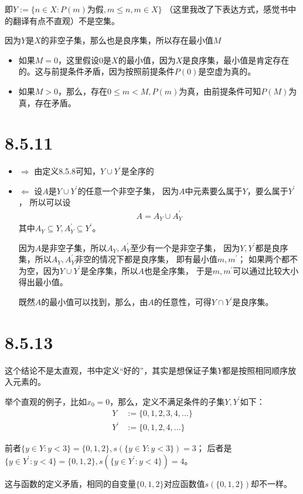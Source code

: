 \documentclass{article}
\begin{document}
即$Y := \{n \in X: P(m) \text{为假},  m \leq n, m \in X  \}$
（这里我改了下表达方式，感觉书中的翻译有点不直观）不是空集。

因为$Y$是$X$的非空子集，那么也是良序集，所以存在最小值$M$

\begin{itemize}
  \item 如果$M = 0$，这里假设$0$是$X$的最小值，因为$X$是良序集，最小值是肯定存在的。这与前提条件矛盾，因为按照前提条件$P(0)$是空虚为真的。
  \item 如果$M > 0$，那么，存在$0 \leq m < M, P(m)$为真，由前提条件可知$P(M)$为真，存在矛盾。
\end{itemize}

\section*{8.5.11}
\begin{itemize}
  \item $\Rightarrow$ 由定义8.5.8可知，$Y \cup Y^\prime$是全序的
  \item $\Leftarrow$ 
        设$A$是$Y \cup Y^\prime$的任意一个非空子集，
        因为$A$中元素要么属于$Y$，要么属于$Y^\prime$，
        所以可以设
        \begin{align*}
          A = A_Y \cup A_Y^\prime
        \end{align*}
        其中$A_Y \subseteq Y, A_Y^\prime \subseteq Y^\prime$。

        因为$A$是非空子集，所以$A_Y, A_Y^\prime$至少有一个是非空子集，
        因为$Y, Y^\prime$都是良序集，所以$A_Y, A_Y^\prime$非空的情况下都是良序集，
        即有最小值$m, m^\prime$；
        如果两个都不为空，因为$Y \cup Y^\prime$是全序集，所以$A$也是全序集，
        于是$m, m^\prime$可以通过比较大小
        得出最小值。
        
        既然$A$的最小值可以找到，那么，由$A$的任意性，可得$Y \cap Y^\prime $是良序集。


\end{itemize}

\section*{8.5.13}

\begin{zremark}
  这个结论不是太直观，书中定义“好的”，其实是想保证子集$Y$都是按照相同顺序放入元素的。

  举个直观的例子，比如$x_0 = 0$，那么，定义不满足条件的子集$Y,Y^\prime$如下：
  \begin{align*}
    Y        & := \{0, 1, 2, 3, 4,...\} \\
    Y^\prime & := \{ 0, 1, 2, 4,... \}
  \end{align*}

  前者$\{y \in Y: y < 3\} = \{0, 1, 2\}, s(\{y \in Y: y < 3\}) = 3$；
  后者是$\{y \in Y^\prime: y < 4\} = \{0, 1, 2\}, s(\{y \in Y^\prime: y < 4\}) = 4$。

  这与函数的定义矛盾，相同的自变量$\{0, 1, 2\}$对应函数值$s(\{0, 1, 2\})$却不一样。
\end{zremark}
\end{document}
